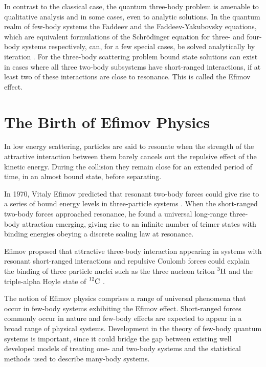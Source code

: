 In contrast to the classical case, the quantum three-body problem is amenable to qualitative analysis \cite{efimov1990qualitative} and in some cases, even to analytic solutions. In the quantum realm of few-body systems the Faddeev and the Faddeev-Yakubovsky equations, which are equivalent formulations of the Schr{\"o}dinger equation for three- and four-body systems respectively, can, for a few special cases, be solved analytically by iteration \cite{Faddeev:1960su, Zubarev:1994}. For the three-body scattering problem bound state solutions can exist in cases where all three two-body subsystems have short-ranged interactions, if at least two of these interactions are close to resonance. This is called the Efimov effect. 

\section{The Birth of Efimov Physics}
In low energy scattering, particles are said to resonate when the strength of the attractive interaction between them barely cancels out the repulsive effect of the kinetic energy. During the collision they remain close for an extended period of time, in an almost bound state, before separating. 

In 1970, Vitaly Efimov predicted that resonant two-body forces could give rise to a series of bound energy levels in three-particle systems \cite{Efimov:1970zz}. When the short-ranged two-body forces approached resonance, he found a universal long-range three-body attraction emerging, giving rise to an infinite number of trimer states with binding energies obeying a discrete scaling law at resonance.  

Efimov proposed that attractive three-body interaction appearing in systems with resonant short-ranged interactions and repulsive Coulomb forces could explain the binding of three particle nuclei such as the three nucleon triton $\prescript{3}{}{\mathrm{H}}$ and the triple-alpha Hoyle state of $\prescript{12}{}{\mathrm{C}}$ \cite{Efimov:1970zz,Efimov:1971zz}.

The notion of Efimov physics comprises a range of universal phenomena that occur in few-body systems exhibiting the Efimov effect. Short-ranged forces commonly occur in nature and few-body effects are expected to appear in a broad range of physical systems. Development in the theory of few-body quantum systems is important, since it could bridge the gap between existing well developed models of treating one- and two-body systems and the statistical methods used to describe many-body systems.

